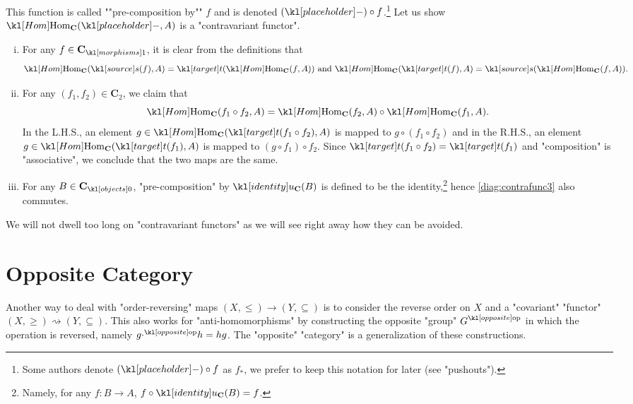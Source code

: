 \documentclass[main.tex]{subfiles}
\begin{document}
\begin{exmp}
\begin{enumerate}
		\AP This function is called ""pre-composition by"" $f$ and is denoted $(\placeholder) \circ f$.\footnote{Some authors denote $(\placeholder) \circ f$ as $f_*$, we prefer to keep this notation for later (see "pushouts").} Let us show $\Hom_{\mathbf{C}}(\placeholder,A)$ is a "contravariant functor".%
		\begin{enumerate}[i.]
			\item For any $f \in \mor{\mathbf{C}}$, it is clear from the definitions that \[\Hom_{\mathbf{C}}(\source(f),A) = \target(\Hom_{\mathbf{C}}(f,A))\text{ and } \Hom_{\mathbf{C}}(\target(f),A) = \source(\Hom_{\mathbf{C}}(f,A)).\]
			\item For any $(f_1,f_2) \in \mathbf{C}_2$, we claim that \[\Hom_{\mathbf{C}}(f_1\circ f_2,A) = \Hom_{\mathbf{C}}(f_2,A)\circ \Hom_{\mathbf{C}}(f_1,A).\] In the L.H.S., an element $g \in \Hom_{\mathbf{C}}(\target(f_1\circ f_2),A)$ is mapped to $g\circ (f_1 \circ f_2)$ and in the R.H.S., an element $g \in \Hom_{\mathbf{C}}(\target(f_1),A)$ is mapped to $(g\circ f_1) \circ f_2$. Since $\target(f_1 \circ f_2) = \target(f_1)$ and "composition" is "associative", we conclude that the two maps are the same.
			\item For any $B \in \obj{\mathbf{C}}$, "pre-composition" by $\idu_{\mathbf{C}}(B)$ is defined to be the identity,\footnote{Namely, for any $f: B \rightarrow A$, $f \circ \idu_{\mathbf{C}}(B) = f$.} hence \eqref{diag:contrafunc3} also commutes.
		\end{enumerate}
	\end{enumerate}
\end{exmp}
We will not dwell too long on "contravariant functors" as we will see right away how they can be avoided.
\section{Opposite Category}
Another way to deal with "order-reversing" maps $(X, \leq) \rightarrow (Y, \subseteq)$ is to consider the reverse order on $X$ and a "covariant" "functor" $(X, \geq) \rightsquigarrow (Y, \subseteq)$. This also works for "anti-homomorphisms" by constructing the opposite "group" $\op{G}$ in which the operation is reversed, namely $g\op{\cdot} h = hg$. The "opposite" "category" is a generalization of these constructions.
\end{document}
